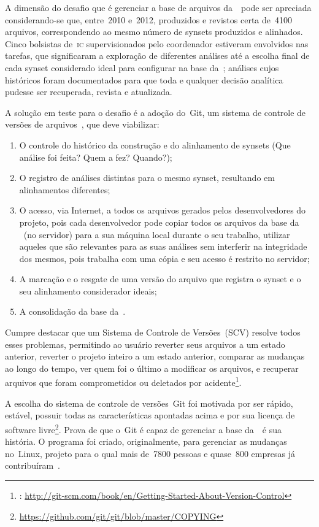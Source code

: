 A dimensão do desafio que é gerenciar a base de arquivos da~\wnbr\ pode ser
apreciada considerando-se que, entre~2010 e~2012, produzidos e revistos certa
de~4100 arquivos, correspondendo ao mesmo número de synsets produzidos e
alinhados. Cinco bolsistas de~\textsc{ic} supervisionados pelo coordenador
estiveram envolvidos nas tarefas, que significaram a exploração de diferentes
análises até a escolha final de cada synset considerado ideal para configurar
na base da~\wnbr; análises cujos históricos foram documentados para que toda e
qualquer decisão analítica pudesse ser recuperada, revista e atualizada.

A solução em teste para o desafio é a adoção do~Git, um sistema de controle de
versões de arquivos~\cite{chacon}, que deve viabilizar:

\begin{enumerate}
  \item O controle do histórico da construção e do alinhamento de synsets (Que
    análise foi feita? Quem a fez? Quando?);
  \item O registro de análises distintas para o mesmo synset, resultando em
    alinhamentos diferentes;
  \item O acesso, via Internet, a todos os arquivos gerados pelos
    desenvolvedores do projeto, pois cada desenvolvedor pode copiar todos os
    arquivos da base da \wnbr\ (no servidor) para a sua máquina local durante o
    seu trabalho, utilizar aqueles que são relevantes para as suas análises sem
    interferir na integridade dos mesmos, pois trabalha com uma cópia e seu
    acesso é restrito no servidor;
  \item A marcação e o resgate de uma versão do arquivo que registra o synset e
    o seu alinhamento considerador ideais;
  \item A consolidação da base da~\wnbr.
\end{enumerate}

Cumpre destacar que um Sistema de Controle de Versões~(SCV) resolve todos esses problemas,
permitindo ao usuário reverter seus arquivos a um estado anterior, reverter o
projeto inteiro a um estado anterior, comparar as mudanças ao longo do tempo,
ver quem foi o último a modificar os arquivos, e recuperar arquivos que foram
comprometidos ou deletados por acidente\footnote{:
\url{http://git-scm.com/book/en/Getting-Started-About-Version-Control}}.

A escolha do sistema de controle de versões~Git foi motivada por ser rápido,
estável, possuir todas as características apontadas acima e por sua licença de
software livre\footnote{\url{https://github.com/git/git/blob/master/COPYING}}.
Prova de que o~Git é capaz de gerenciar a base da~\wnbr\ é sua história. O
programa foi criado, originalmente, para gerenciar as mudanças no~Linux,
projeto para o qual mais de~7800 pessoas e quase~800 empresas já
contribuíram~\cite[p.~1]{corbetetal}.

